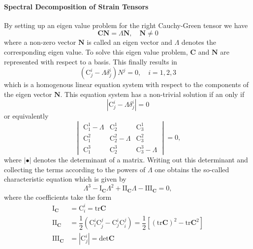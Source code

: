 \paragraph*{Spectral Decomposition of Strain Tensors}
By setting up an eigen value problem for the right Cauchy-Green tensor we have
\begin{equation}
    \mathbf{C} \bm{N} = \Lambda \bm{N}, \quad \bm{N} \neq 0
\end{equation}
where a non-zero vector \(\bm{N}\) is called an eigen vector and \(\Lambda\) denotes the corresponding eigen value. To solve this eigen value problem, \(\mathbf{C}\) and \(\bm{N}\) are represented with respect to a basis. This finally results in 
\begin{equation}
    (\text{C}^{i}_{j} - \Lambda\delta^{i}_{j})N^{j} = 0, \quad
    i = 1,2,3
\end{equation}
which is a homogenous linear equation system with respect to the components of the eigen vector \(\bm{N}\). This equation system has a non-trivial solution if an only if
\begin{equation}
    |\text{C}^{i}_{j} - \Lambda\delta^{i}_{j}| = 0
\end{equation}
or equivalently
\begin{equation}
    \begin{vmatrix}
        \text{C}^{1}_{1}  - \Lambda & \text{C}^{1}_{2} & \text{C}^{1}_{3} \\[0.5em]
        \text{C}^{2}_{1} & \text{C}^{2}_{2} - \Lambda & \text{C}^{2}_{3} \\[0.5em]
        \text{C}^{3}_{1} & \text{C}^{3}_{2} & \text{C}^{3}_{3} - \Lambda
    \end{vmatrix} = 0,
\end{equation}
where \(|\bullet|\) denotes the determinant of a matrix. Writing out this determinant and collecting the terms according to the powers of \(\Lambda\) one obtains the so-called characteristic equation which is given by
\begin{equation}
    \Lambda^{3} 
    - \text{I}_{\mathbf{C}}\Lambda^{2}
    + \text{II}_{\mathbf{C}}\Lambda
    - \text{III}_{\mathbf{C}} = 0,
\end{equation}
where the coefficients take the form
\begin{align}
    \text{I}_{\mathbf{C}} &= \text{C}_{i}^{i} = \text{tr}\mathbf{C} \\
    \text{II}_{\mathbf{C}} &= \dfrac{1}{2}(\text{C}^{i}_{i}\text{C}^{j}_{j} - \text{C}^{i}_{j}\text{C}^{j}_{i}) = \dfrac{1}{2}[(\text{tr}\mathbf{C})^{2} - \text{tr}\mathbf{C}^{2}]\\  
    \text{III}_{\mathbf{C}} &= |\text{C}^{i}_{j}| = \text{det}\mathbf{C}
\end{align}
